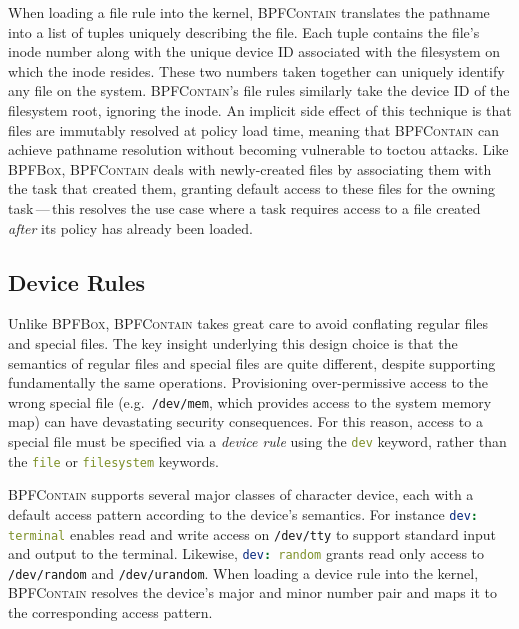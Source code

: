 \documentclass[
  fontsize=12pt,
  titlepage=firstiscover,
  paper=letter,
oneside,
  cleardoublepage=plain,
  parskip=half-,
  DIV=10,
  parindent,
  appendixprefix,
  chapterprefix,
  listof=totoc,
]{scrbook}
\newcommand{\bpfbox}{\textsc{BPFBox}}
\newcommand{\bpfcontain}{\textsc{BPFContain}}
\begin{document}
When loading a file rule into the kernel, \bpfcontain{} translates the pathname into
a list of tuples uniquely describing the file. Each tuple contains the file's inode number
along with the unique device ID associated with the filesystem on which the inode resides.
These two numbers taken together can uniquely identify any file on the system.
\bpfcontain{}'s file rules similarly take the device ID of the filesystem root, ignoring
the inode. An implicit side effect of this technique is that files are immutably resolved
at policy load time, meaning that \bpfcontain{} can achieve pathname resolution without
becoming vulnerable to \gls{toctou} attacks. Like \bpfbox{}, \bpfcontain{} deals with
newly-created files by associating them with the task that created them, granting default
access to these files for the owning task\,---\,this resolves the use case where a task
requires access to a file created \textit{after} its policy has already been loaded.

\subsection{Device Rules}

Unlike \bpfbox{}, \bpfcontain{} takes great care to avoid conflating regular files and
special files. The key insight underlying this design choice is that the semantics of
regular files and special files are quite different, despite supporting fundamentally the
same operations. Provisioning over-permissive access to the wrong special file
(e.g.\ \texttt{/dev/mem}, which provides access to the system memory map) can have
devastating security consequences. For this reason, access to a special file must be
specified via a \textit{device rule} using the \lstinline[language=yaml]|dev| keyword,
rather than the \lstinline[language=yaml]|file| or \lstinline[language=yaml]|filesystem|
keywords.

\bpfcontain{} supports several major classes of character device, each with a default
access pattern according to the device's semantics.  For instance
\lstinline[language=yaml]|dev: terminal| enables read and write access on
\texttt{/dev/tty} to support standard input and output to the terminal. Likewise,
\lstinline[language=yaml]|dev: random| grants read only access to \texttt{/dev/random} and
\texttt{/dev/urandom}. When loading a device rule into the kernel, \bpfcontain{} resolves
the device's major and minor number pair and maps it to the corresponding access pattern.
\end{document}
